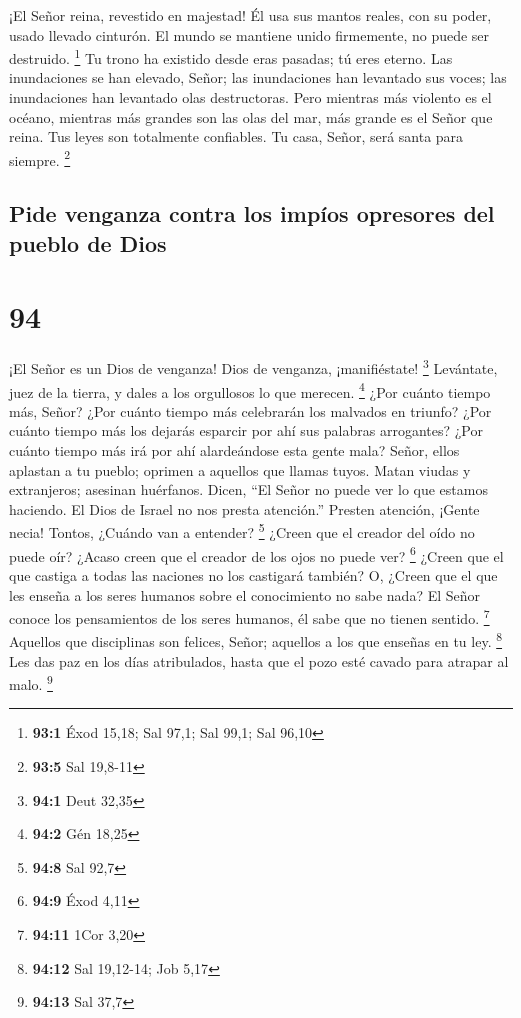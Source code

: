  ¡El Señor reina, revestido en majestad! Él usa sus mantos
reales, con su poder, usado llevado cinturón. El mundo se mantiene unido
firmemente, no puede ser destruido. \footnote{\textbf{93:1} Éxod 15,18;
  Sal 97,1; Sal 99,1; Sal 96,10}  Tu trono ha existido desde
eras pasadas; tú eres eterno.  Las inundaciones se han
elevado, Señor; las inundaciones han levantado sus voces; las
inundaciones han levantado olas destructoras.  Pero mientras
más violento es el océano, mientras más grandes son las olas del mar,
más grande es el Señor que reina.  Tus leyes son totalmente
confiables. Tu casa, Señor, será santa para siempre. \footnote{\textbf{93:5}
  Sal 19,8-11}

\hypertarget{pide-venganza-contra-los-impuxedos-opresores-del-pueblo-de-dios}{%
\subsection{Pide venganza contra los impíos opresores del pueblo de
Dios}\label{pide-venganza-contra-los-impuxedos-opresores-del-pueblo-de-dios}}

\hypertarget{section-93}{%
\section{94}\label{section-93}}

 ¡El Señor es un Dios de venganza! Dios de venganza,
¡manifiéstate! \footnote{\textbf{94:1} Deut 32,35} 
Levántate, juez de la tierra, y dales a los orgullosos lo que merecen.
\footnote{\textbf{94:2} Gén 18,25}  ¿Por cuánto tiempo más,
Señor? ¿Por cuánto tiempo más celebrarán los malvados en triunfo?
 ¿Por cuánto tiempo más los dejarás esparcir por ahí sus
palabras arrogantes? ¿Por cuánto tiempo más irá por ahí alardeándose
esta gente mala?  Señor, ellos aplastan a tu pueblo; oprimen
a aquellos que llamas tuyos.  Matan viudas y extranjeros;
asesinan huérfanos.  Dicen, ``El Señor no puede ver lo que
estamos haciendo. El Dios de Israel no nos presta atención.''
 Presten atención, ¡Gente necia! Tontos, ¿Cuándo van a
entender? \footnote{\textbf{94:8} Sal 92,7}  ¿Creen que el
creador del oído no puede oír? ¿Acaso creen que el creador de los ojos
no puede ver? \footnote{\textbf{94:9} Éxod 4,11}  ¿Creen
que el que castiga a todas las naciones no los castigará también? O,
¿Creen que el que les enseña a los seres humanos sobre el conocimiento
no sabe nada?  El Señor conoce los pensamientos de los
seres humanos, él sabe que no tienen sentido. \footnote{\textbf{94:11}
  1Cor 3,20}  Aquellos que disciplinas son felices, Señor;
aquellos a los que enseñas en tu ley. \footnote{\textbf{94:12} Sal
  19,12-14; Job 5,17}  Les das paz en los días atribulados,
hasta que el pozo esté cavado para atrapar al malo. \footnote{\textbf{94:13}
  Sal 37,7}

